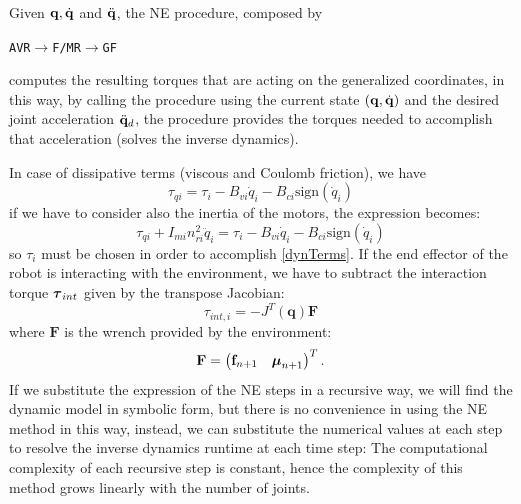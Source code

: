 \documentclass[10pt, a4paper]{report}
\newcommand{\q}{{\mathbf q}}
\begin{document}
\begin{boxobservation}{}{}
    Given $\q,\dq$ and ${\ddot{\mathbf q}}$, the NE procedure, composed by \begin{center}
       \texttt{AVR}$\rightarrow$\texttt{F/MR}$\rightarrow$\texttt{GF} 
    \end{center}
    computes the resulting torques that are acting on the generalized coordinates, in this way, by calling the procedure using the current state $(\q,\dq)$ and the desired joint acceleration ${\ddot{\mathbf q}}_d$, the procedure provides the torques needed to accomplish that acceleration (solves the inverse dynamics).
\end{boxobservation}

\noindent In case of dissipative terms (viscous and Coulomb friction), we have\begin{equation}
    \tau_{qi}=
    \tau_i-B_{vi}\dot q_i-B_{ci}
    \text{sign}(\dot q_i)
\end{equation}
if we have to consider also the inertia of the motors, the expression becomes:\begin{equation}\label{dynTerms}
    \tau_{qi}+I_{mi}n_{ri}^2\ddot q_i=
    \tau_i-B_{vi}\dot q_i-B_{ci}
    \text{sign}(\dot q_i)
\end{equation}
so $\tau_i$ must be chosen in order to accomplish \eqref{dynTerms}. If the end effector of the robot is interacting with the environment, we have to subtract the interaction torque ${\boldsymbol{\tau}}_{int}$ given by the transpose Jacobian:\begin{equation}
    \tau_{int,i}=-J^T(\q)\mathbf F 
\end{equation}
where $\mathbf F$ is the wrench provided by the environment:\begin{equation}
    \mathbf F=\begin{pmatrix}
        \mathbf f_{n+1}& {\boldsymbol{\mu}}_{n+1}
    \end{pmatrix}^T.
\end{equation}
If we substitute the expression of the NE steps in a recursive way, we will find the dynamic model in symbolic form, but there is no convenience in using the NE method in this way, instead, we can substitute the numerical values at each step to resolve the inverse dynamics runtime at each time step: The computational complexity of each recursive step is constant, hence the complexity of this method grows linearly with the number of joints.\bigskip
\end{document}
